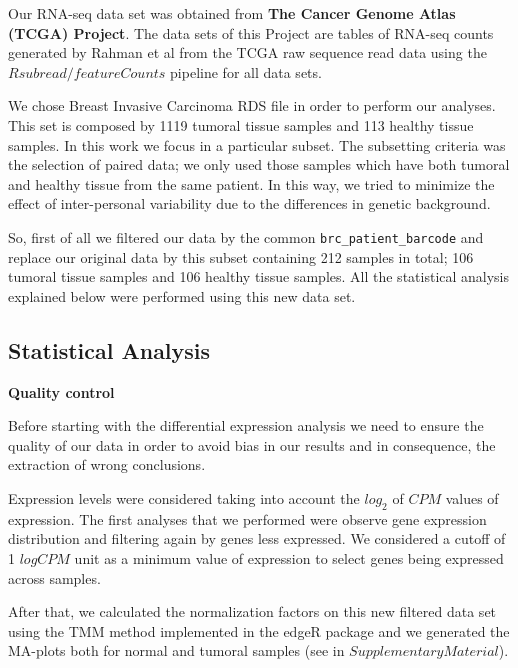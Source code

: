 \documentclass[9pt,twocolumn,twoside]{gsajnl}
\begin{document}
Our RNA-seq data set was obtained from \textbf{The Cancer Genome Atlas (TCGA) Project}. The data sets of this Project are tables of RNA-seq counts generated by Rahman et al \citep{Rahman15112015} from the TCGA raw sequence read data using the $Rsubread / featureCounts$ pipeline for all data sets.
\vspace{2 mm}

We chose Breast Invasive Carcinoma RDS file in order to perform our analyses. This set is composed by 1119 tumoral tissue samples and 113 healthy tissue samples. In this work we focus in a particular subset. The subsetting criteria was the selection of paired data; we only used those samples which have both tumoral and healthy tissue from the same patient. In this way, we tried to minimize the effect of inter-personal variability due to the differences in genetic background.
\vspace{2 mm}
  
So, first of all we filtered our data by the common \verb+brc_patient_barcode+ and replace our original data by this subset containing 212 samples in total; 106 tumoral tissue samples and 106 healthy tissue samples. All the statistical analysis explained below were performed using this new data set.


\subsection*{Statistical Analysis} 
\vspace{2mm}

\textbf{Quality control}
\vspace{2mm}

Before starting with the differential expression analysis we need to ensure the quality of our data in order to avoid bias in our results and in consequence, the extraction of wrong conclusions. 
\vspace{2mm}

Expression levels were considered taking into account the $log_{2}$ of $CPM$ values of expression. The first analyses that we performed were observe gene expression distribution and filtering again by genes less expressed. We considered a cutoff of 1 $log CPM$ unit as a minimum value of expression to select genes being expressed across samples.
\vspace{2mm}

After that, we calculated the normalization factors on this new filtered data set using the TMM method implemented in the edgeR package and we generated the MA-plots both for normal and tumoral samples (see in $Supplementary Material$).
\vspace{2mm}
\end{document}
